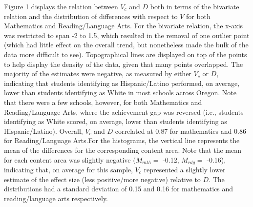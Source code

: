 \documentclass[man, fleqn, noextraspace]{apa6}
\theoremstyle{definition}
\theoremstyle{definition}
\theoremstyle{definition}
\theoremstyle{remark}
\begin{document}
Figure 1 displays the relation between \(V_c\) and \(D\) both in terms
of the bivariate relation and the distribution of differences with
respect to \(V\) for both Mathematics and Reading/Language Arts. For the
bivariate relation, the x-axis was restricted to span -2 to 1.5, which
resulted in the removal of one outlier point (which had little effect on
the overall trend, but nonetheless made the bulk of the data more
difficult to see). Topographical lines are displayed on top of the
points to help display the density of the data, given that many points
overlapped. The majority of the estimates were negative, as measured by
either \(V_c\) or \(D\), indicating that students identifying as
Hispanic/Latino performed, on average, lower than students identifying
as White in most schools across Oregon. Note that there were a few
schools, however, for both Mathematics and Reading/Language Arts, where
the achievement gap was reversed (i.e., students identifying as White
scored, on average, lower than students identifying as Hispanic/Latino).
Overall, \(V_c\) and \(D\) correlated at 0.87 for mathematics and 0.86
for Reading/Language Arts.For the histograms, the vertical line
represents the mean of the differences for the corresponding content
area. Note that the mean for each content area was slightly negative
(\(M_{mth} =\) -0.12, \(M_{rdg} =\) -0.16), indicating that, on average
for this sample, \(V_c\) represented a slightly lower estimate of the
effect size (less positive/more negative) relative to \(D\). The
distributions had a standard deviation of 0.15 and 0.16 for mathematics
and reading/language arts respectively.
\end{document}
